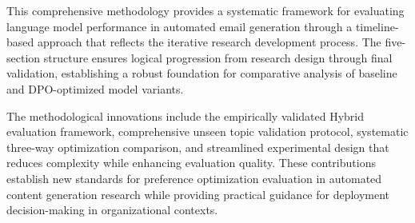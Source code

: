 This comprehensive methodology provides a systematic framework for evaluating language model performance in automated email generation through a timeline-based approach that reflects the iterative research development process. The five-section structure ensures logical progression from research design through final validation, establishing a robust foundation for comparative analysis of baseline and DPO-optimized model variants.

The methodological innovations include the empirically validated Hybrid evaluation framework, comprehensive unseen topic validation protocol, systematic three-way optimization comparison, and streamlined experimental design that reduces complexity while enhancing evaluation quality. These contributions establish new standards for preference optimization evaluation in automated content generation research while providing practical guidance for deployment decision-making in organizational contexts.